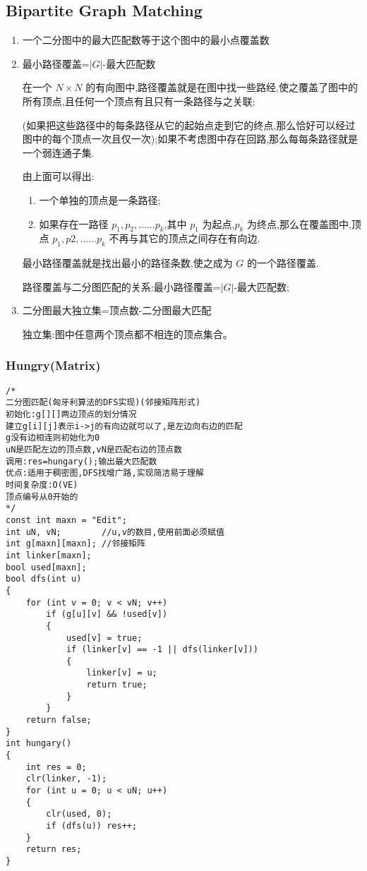 \documentclass[twoside]{article}
\begin{document}
\subsection{Bipartite Graph Matching}
\begin{enumerate}
\item 一个二分图中的最大匹配数等于这个图中的最小点覆盖数

\item 最小路径覆盖=$|G|$-最大匹配数

在一个 $N \times N$ 的有向图中,路径覆盖就是在图中找一些路经,使之覆盖了图中的所有顶点,且任何一个顶点有且只有一条路径与之关联;

(如果把这些路径中的每条路径从它的起始点走到它的终点,那么恰好可以经过图中的每个顶点一次且仅一次);如果不考虑图中存在回路,那么每每条路径就是一个弱连通子集.

由上面可以得出:

\begin{enumerate}
\item 一个单独的顶点是一条路径;

\item 如果存在一路径 $p_1,p_2,......p_k$,其中 $p_1$ 为起点,$p_k$ 为终点,那么在覆盖图中,顶点 $p_1,p2,......p_k$ 不再与其它的顶点之间存在有向边.
\end{enumerate}

最小路径覆盖就是找出最小的路径条数,使之成为 $G$ 的一个路径覆盖.

路径覆盖与二分图匹配的关系:最小路径覆盖=$|G|$-最大匹配数;

\item 二分图最大独立集=顶点数-二分图最大匹配

独立集:图中任意两个顶点都不相连的顶点集合。
\end{enumerate}
\subsubsection{Hungry(Matrix)}
\begin{lstlisting}
/*
二分图匹配(匈牙利算法的DFS实现)(邻接矩阵形式)
初始化:g[][]两边顶点的划分情况
建立g[i][j]表示i->j的有向边就可以了,是左边向右边的匹配
g没有边相连则初始化为0
uN是匹配左边的顶点数,vN是匹配右边的顶点数
调用:res=hungary();输出最大匹配数
优点:适用于稠密图,DFS找增广路,实现简洁易于理解
时间复杂度:O(VE)
顶点编号从0开始的
*/
const int maxn = "Edit";
int uN, vN;        //u,v的数目,使用前面必须赋值
int g[maxn][maxn]; //邻接矩阵
int linker[maxn];
bool used[maxn];
bool dfs(int u)
{
    for (int v = 0; v < vN; v++)
        if (g[u][v] && !used[v])
        {
            used[v] = true;
            if (linker[v] == -1 || dfs(linker[v]))
            {
                linker[v] = u;
                return true;
            }
        }
    return false;
}
int hungary()
{
    int res = 0;
    clr(linker, -1);
    for (int u = 0; u < uN; u++)
    {
        clr(used, 0);
        if (dfs(u)) res++;
    }
    return res;
}
\end{lstlisting}
\end{document}
